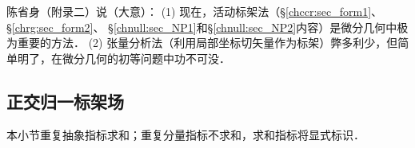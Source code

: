 {\kaishu 
    陈省身（\parencite{cc2001-zh}附录二）说（大意）：
    (1) 现在，活动标架法（\S \ref{chccr:sec_form1}、\S\ref{chrg:sec_form2}、
    \S\ref{chnull:sec_NP1}和\S\ref{chnull:sec_NP2}内容）是微分几何中极为重要的方法．
    (2) 张量分析法（利用局部坐标切矢量作为标架）弊多利少，但简单明了，在微分几何的初等问题中功不可没．
}


%


\subsection{正交归一标架场}\label{chrg:sec_E3-Orthogonal-Normalization}
本小节重复抽象指标求和；重复分量指标不求和，求和指标将显式标识．

